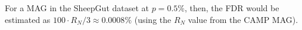 For a MAG in the SheepGut dataset at $p = 0.5\%$, then, the FDR would be estimated as $100 \cdot R_N / 3 \approx 0.0008\%$ (using the $R_N$ value from the CAMP MAG).\endinput